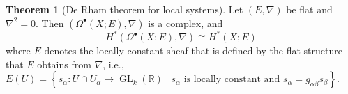 \documentclass[10pt,letterpaper,cm]{nupset}
\theoremstyle{definition}
\theoremstyle{theorem}
\newtheorem{theorem}[definition]{Theorem}
\theoremstyle{remark}
\newcommand{\R}{\mathbb{R}}
\newcommand{\1}{\mathbb{1}}
\newcommand{\0}{\vec 0}
\DeclareMathOperator{\GL}{GL}
\begin{document}
\begin{theorem}[De Rham theorem for local systems]
Let $(E, \nabla)$ be flat and $\nabla^2 =0$. Then $(\Omega^{\bullet}(X; E), \nabla)$ is a complex, and $$H^{\ast}(\Omega^{\bullet}(X; E), \nabla) \cong H^{\ast}(X; \underline{E})$$ where $\underline{E}$ denotes the locally constant sheaf that is defined by the flat structure that $E$ obtains  from $\nabla$, i.e., $\underline{E}(U) = \left\{s_{\alpha} : U \cap U_{\alpha} \to \GL_k(\R) \mid s_{\alpha} \text{ is locally constant and }s_{\alpha} = g_{\alpha{\beta}}s_{\beta}\right\}$.
\end{theorem}
\end{document}
